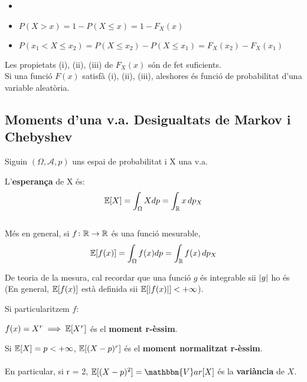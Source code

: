 \begin{obs}
  \begin{itemize}
      \item []
      \item $P(X > x) = 1 - P(X\leq x) = 1 - F_{X}(x)$
      \item $P(x_{1} < X \leq x_{2}) = P(X \leq x_{2}) - P(X \leq x_{1}) = F_{X}(x_{2}) - F_{X}(x_{1})$
  \end{itemize}
\end{obs}

\begin{obs}
  Les propietats (i), (ii), (iii) de $F_{X}(x)$ són de fet suficients.\\
  Si una funció $F(x)$ satisfà (i), (ii), (iii), aleshores és funció de probabilitat d'una variable aleatòria.
\end{obs}
\newpage
\subsection{Moments d'una v.a.  Desigualtats de Markov i Chebyshev}

Siguin $(\Omega, \mathcal{A}, p)$ uns espai de probabilitat i X una v.a.\\
\begin{defi}
  L'\textbf{esperança} de X és: 
  \[
  \mathbb{E}[X] = \int_{\Omega}X dp = \int_{\mathbb{R}} x \, dp_{X}
  \]
  \\
  Més en general, si $f\colon \mathbb{R} \to \mathbb{R}$ és una funció mesurable, 
  \[
    \mathbb{E}[f(x)] = \int_{\Omega}f(x) dp = \int_{\mathbb{R}} f(x) \, dp_{X}
  \]
\end{defi}

\begin{obs}
  De teoria de la mesura, cal recordar que una funció $g$ és integrable sii $\left\vert g \right\vert$ ho és
  (En general, $\mathbb{E}[f(x)]$ està definida sii $\mathbb{E}[\left\vert f(x) \right\vert]<+\infty$). \\
\end{obs}

Si particularitzem $f$:

\begin{defi}
  $f(x) = X^{r} \implies \mathbb{E}[X^{r}]$ és el \textbf{moment r-èssim}.
\end{defi}

\begin{defi}
  Si $\mathbb{E}[X] = p < +\infty$, $\mathbb{E}[(X-p)^{r}]$ és el \textbf{moment normalitzat r-èssim}.\\\\
  En particular, si r = 2, $\E[(X-p)^{2}] = \mathbbm{V}ar[X]$ és la \textbf{variància} de $X$.
\end{defi}

